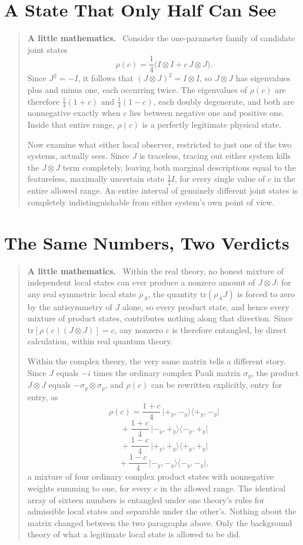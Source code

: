 \documentclass[12pt,openany]{book}
\newenvironment{lowmath}{\begin{quote}\small\noindent\textbf{A little mathematics.}\ }{\end{quote}}
\begin{document}
\section{A State That Only Half Can See}

\begin{lowmath}
Consider the one-parameter family of candidate joint states
\[
\rho(c)=\frac{1}{4}\Big(I\otimes I+c\,J\otimes J\Big).
\]
Since $J^2=-I$, it follows that $(J\otimes J)^2=I\otimes I$, so $J\otimes J$ has eigenvalues plus and minus one, each occurring twice. The eigenvalues of $\rho(c)$ are therefore $\tfrac14(1+c)$ and $\tfrac14(1-c)$, each doubly degenerate, and both are nonnegative exactly when $c$ lies between negative one and positive one. Inside that entire range, $\rho(c)$ is a perfectly legitimate physical state.

Now examine what either local observer, restricted to just one of the two systems, actually sees. Since $J$ is traceless, tracing out either system kills the $J\otimes J$ term completely, leaving both marginal descriptions equal to the featureless, maximally uncertain state $\tfrac12 I$, for every single value of $c$ in the entire allowed range. An entire interval of genuinely different joint states is completely indistinguishable from either system's own point of view.
\end{lowmath}

\section{The Same Numbers, Two Verdicts}

\begin{lowmath}
Within the real theory, no honest mixture of independent local states can ever produce a nonzero amount of $J\otimes J$: for any real symmetric local state $\rho_A$, the quantity $\mathrm{tr}(\rho_A J)$ is forced to zero by the antisymmetry of $J$ alone, so every product state, and hence every mixture of product states, contributes nothing along that direction. Since $\mathrm{tr}[\rho(c)(J\otimes J)]=c$, any nonzero $c$ is therefore entangled, by direct calculation, within real quantum theory.

Within the complex theory, the very same matrix tells a different story. Since $J$ equals $-i$ times the ordinary complex Pauli matrix $\sigma_y$, the product $J\otimes J$ equals $-\sigma_y\otimes\sigma_y$, and $\rho(c)$ can be rewritten explicitly, entry for entry, as
\[
\rho(c)=\frac{1+c}{4}\,\big|{+_y,-_y}\big\rangle\big\langle{+_y,-_y}\big|
\]
\[
{}+\frac{1+c}{4}\,\big|{-_y,+_y}\big\rangle\big\langle{-_y,+_y}\big|
\]
\[
{}+\frac{1-c}{4}\,\big|{+_y,+_y}\big\rangle\big\langle{+_y,+_y}\big|
\]
\[
{}+\frac{1-c}{4}\,\big|{-_y,-_y}\big\rangle\big\langle{-_y,-_y}\big|,
\]
a mixture of four ordinary complex product states with nonnegative weights summing to one, for every $c$ in the allowed range. The identical array of sixteen numbers is entangled under one theory's rules for admissible local states and separable under the other's. Nothing about the matrix changed between the two paragraphs above. Only the background theory of what a legitimate local state is allowed to be did.
\end{lowmath}
\end{document}
